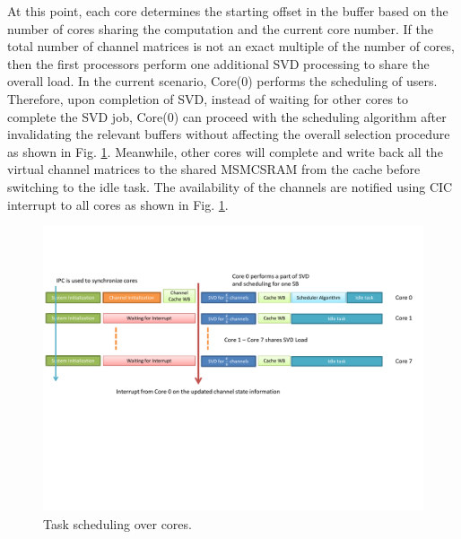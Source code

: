 \documentclass[conference,letterpaper,9pt]{./../IEEEtran}
\begin{document}
At this point, each core determines the starting offset in the buffer based on the number of cores sharing the computation and the current core number. If the total number of channel matrices is not an exact multiple of the number of cores, then the first  processors perform one additional SVD processing to share the overall load. In the current scenario, Core(0) performs the scheduling of users. Therefore, upon completion of SVD, instead of waiting for other cores to complete the SVD job, Core(0) can proceed with the scheduling algorithm after invalidating the relevant buffers without affecting the overall selection procedure as shown in Fig. \ref{sched_cores}. Meanwhile, other cores will complete and write back all the virtual channel matrices to the shared \ac{MSMCSRAM} from the cache before switching to the idle task. The availability of the channels are notified using \ac{CIC} interrupt to all cores as shown in Fig. \ref{sched_cores}.
\begin{figure}
	\centering
	\includegraphics[trim=0in 3.25in 0in 1.0in,width=\columnwidth]{overall_scheduling}
	\caption{Task scheduling over  cores.}
	\label{sched_cores}
	\vspace{-0.15in}
\end{figure}
\end{document}
